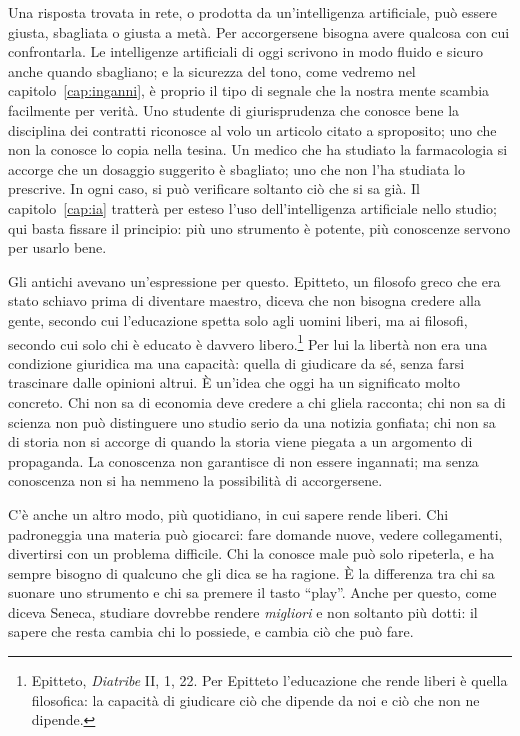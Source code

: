 Una risposta trovata in rete, o prodotta da un'intelligenza artificiale,
può essere giusta, sbagliata o giusta a metà. Per accorgersene bisogna
avere qualcosa con cui confrontarla. Le intelligenze artificiali di oggi
scrivono in modo fluido e sicuro anche quando sbagliano; e la
sicurezza del tono, come vedremo nel capitolo~\ref{cap:inganni}, è
proprio il tipo di segnale che la nostra mente scambia facilmente per
verità. Uno studente di giurisprudenza che conosce bene la disciplina
dei contratti riconosce al volo un articolo citato a sproposito; uno che
non la conosce lo copia nella tesina. Un medico che ha studiato la
farmacologia si accorge che un dosaggio suggerito è sbagliato; uno che
non l'ha studiata lo prescrive. In ogni caso, si può verificare soltanto
ciò che si sa già. Il capitolo~\ref{cap:ia} tratterà per esteso l'uso
dell'intelligenza artificiale nello studio; qui basta fissare il
principio: più uno strumento è potente, più conoscenze servono per
usarlo bene.

Gli antichi avevano un'espressione per questo. Epitteto, un filosofo
greco che era stato schiavo prima di diventare maestro, diceva che non
bisogna credere alla gente, secondo cui l'educazione spetta solo agli
uomini liberi, ma ai filosofi, secondo cui solo chi è educato è davvero
libero.\footnote{Epitteto, \emph{Diatribe} II, 1, 22. Per Epitteto
l'educazione che rende liberi è quella filosofica: la capacità di
giudicare ciò che dipende da noi e ciò che non ne dipende.} Per lui la
libertà non era una condizione giuridica ma una capacità: quella di
giudicare da sé, senza farsi trascinare dalle opinioni altrui. È
un'idea che oggi ha un significato molto concreto. Chi non sa di
economia deve credere a chi gliela racconta; chi non sa di scienza non
può distinguere uno studio serio da una notizia gonfiata; chi non sa di
storia non si accorge di quando la storia viene piegata a un argomento
di propaganda. La conoscenza non garantisce di non essere ingannati; ma
senza conoscenza non si ha nemmeno la possibilità di accorgersene.

C'è anche un altro modo, più quotidiano, in cui sapere rende liberi. Chi
padroneggia una materia può giocarci: fare domande nuove, vedere
collegamenti, divertirsi con un problema difficile. Chi la conosce
male può solo ripeterla, e ha sempre bisogno di qualcuno che gli dica se
ha ragione. È la differenza tra chi sa suonare uno strumento e chi sa
premere il tasto \enquote{play}. Anche per questo, come diceva Seneca,
studiare dovrebbe rendere \emph{migliori} e non soltanto più dotti: il
sapere che resta cambia chi lo possiede, e cambia ciò che può fare.

